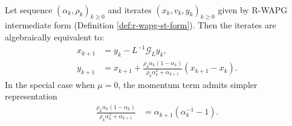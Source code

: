 \documentclass[12pt]{article}
\begin{document}
    \begin{proposition}\label{prop:r-wapg-momentum-repr}
        \;\\
        Let sequence $(\alpha_k, \rho_k)_{k \ge0}$ and iterates $(x_k, v_k, y_k)_{k\ge 0}$ given by R-WAPG intermediate form (Definition \ref{def:r-wapg-st-form}). 
        Then the iterates are algebraically equivalent to: 
        \begin{align*}
            x_{k + 1} &= y_k - L^{-1}\mathcal G_Ly_k, 
            \\
            y_{k + 1} &= 
            x_{k + 1} + 
            \frac{\rho_k\alpha_k(1 - \alpha_k)}{\rho_k\alpha_k^2 + \alpha_{k + 1}}(x_{k + 1} - x_k). 
        \end{align*}
        In the special case when $\mu = 0$, the momentum term admits simpler representation 
        \begin{align*}
        \frac{\rho_k\alpha_k(1 - \alpha_k)}{\rho_k\alpha_k^2 + \alpha_{k + 1}}
        & = \alpha_{k + 1}(\alpha_k^{-1} - 1). 
        \end{align*}
    \end{proposition}
\end{document}
